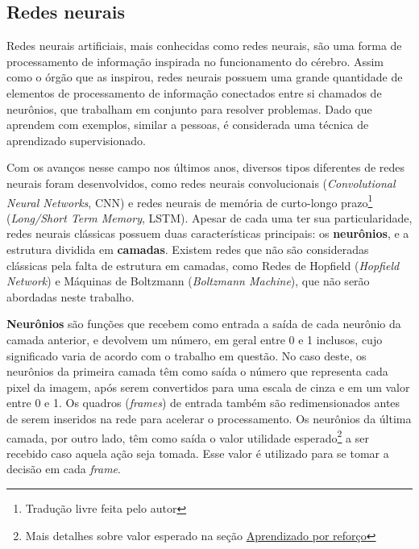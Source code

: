 \subsection{Redes neurais}
\label{sec:nn}

Redes neurais artificiais, mais conhecidas como redes neurais, são uma forma de processamento de informação inspirada no funcionamento do cérebro. Assim como o órgão que as inspirou, redes neurais possuem uma grande quantidade de elementos de processamento de informação conectados entre si chamados de neurônios, que trabalham em conjunto para resolver problemas. Dado que aprendem com exemplos, similar a pessoas, é considerada uma técnica de aprendizado supervisionado.

Com os avanços nesse campo nos últimos anos, diversos tipos diferentes de redes neurais foram desenvolvidos, como redes neurais convolucionais (\textit{Convolutional Neural Networks}, CNN) e redes neurais de memória de curto-longo prazo\footnote{Tradução livre feita pelo autor} (\textit{Long/Short Term Memory}, LSTM). Apesar de cada uma ter sua particularidade, redes neurais clássicas possuem duas características principais: os \textbf{neurônios}, e a estrutura dividida em \textbf{camadas}. Existem redes que não são consideradas clássicas pela falta de estrutura em camadas, como Redes de Hopfield (\textit{Hopfield Network}) e Máquinas de Boltzmann (\textit{Boltzmann Machine}), que não serão abordadas neste trabalho.

\textbf{Neurônios} são funções que recebem como entrada a saída de cada neurônio da camada anterior, e devolvem um número, em geral entre 0 e 1 inclusos, cujo significado varia de acordo com o trabalho em questão.
No caso deste, os neurônios da primeira camada têm como saída o número que representa cada pixel da imagem, após serem convertidos para uma escala de cinza e em um valor entre 0 e 1. Os quadros (\textit{frames}) de entrada também são redimensionados antes de serem inseridos na rede para acelerar o processamento.
Os neurônios da última camada, por outro lado, têm como saída o valor utilidade esperado\footnote{Mais detalhes sobre valor esperado na seção \hyperref[sec:rl]{Aprendizado por reforço}} a ser recebido caso aquela ação seja tomada. Esse valor é utilizado para se tomar a decisão em cada \textit{frame}. 

